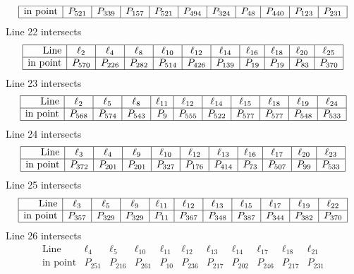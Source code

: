 \documentclass{article}
\begin{document}
{$$\begin{array}{|r*{10}{|c}|}
\hline
\mbox{in point}  & P_{521} & P_{339} & P_{157} & P_{521} & P_{494} & P_{324} & P_{48} & P_{440} & P_{123} & P_{231}\\
\hline
\end{array}
$$
Line 22 intersects 
$$
\begin{array}{|r*{10}{|c}|}
\hline
\mbox{Line}  & \ell_{2} & \ell_{4} & \ell_{8} & \ell_{10} & \ell_{12} & \ell_{14} & \ell_{16} & \ell_{18} & \ell_{20} & \ell_{25}\\
\hline
\mbox{in point}  & P_{570} & P_{226} & P_{282} & P_{514} & P_{426} & P_{139} & P_{19} & P_{19} & P_{83} & P_{370}\\
\hline
\end{array}
$$
Line 23 intersects 
$$
\begin{array}{|r*{10}{|c}|}
\hline
\mbox{Line}  & \ell_{2} & \ell_{5} & \ell_{8} & \ell_{11} & \ell_{12} & \ell_{14} & \ell_{15} & \ell_{18} & \ell_{19} & \ell_{24}\\
\hline
\mbox{in point}  & P_{568} & P_{574} & P_{543} & P_{9} & P_{555} & P_{522} & P_{577} & P_{577} & P_{548} & P_{533}\\
\hline
\end{array}
$$
Line 24 intersects 
$$
\begin{array}{|r*{10}{|c}|}
\hline
\mbox{Line}  & \ell_{3} & \ell_{4} & \ell_{9} & \ell_{10} & \ell_{12} & \ell_{13} & \ell_{16} & \ell_{17} & \ell_{20} & \ell_{23}\\
\hline
\mbox{in point}  & P_{372} & P_{201} & P_{201} & P_{327} & P_{176} & P_{414} & P_{73} & P_{507} & P_{99} & P_{533}\\
\hline
\end{array}
$$
Line 25 intersects 
$$
\begin{array}{|r*{10}{|c}|}
\hline
\mbox{Line}  & \ell_{3} & \ell_{5} & \ell_{9} & \ell_{11} & \ell_{12} & \ell_{13} & \ell_{15} & \ell_{17} & \ell_{19} & \ell_{22}\\
\hline
\mbox{in point}  & P_{357} & P_{329} & P_{329} & P_{11} & P_{367} & P_{348} & P_{387} & P_{344} & P_{382} & P_{370}\\
\hline
\end{array}
$$
Line 26 intersects 
$$
\begin{array}{|r*{10}{|c}|}
\hline
\mbox{Line}  & \ell_{4} & \ell_{5} & \ell_{10} & \ell_{11} & \ell_{12} & \ell_{13} & \ell_{14} & \ell_{17} & \ell_{18} & \ell_{21}\\
\hline
\mbox{in point}  & P_{251} & P_{216} & P_{261} & P_{10} & P_{236} & P_{217} & P_{202} & P_{246} & P_{217} & P_{231}\\

\end{array}$$}
\end{document}
